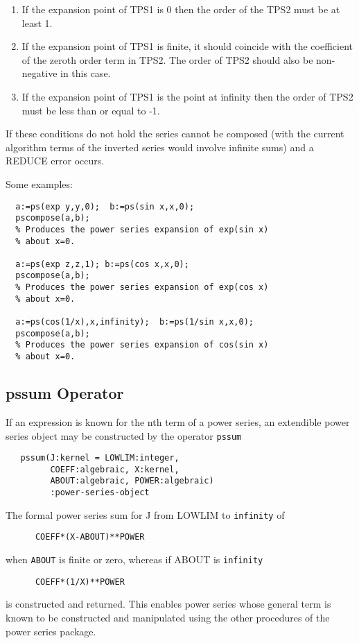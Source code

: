 \begin{enumerate}
\item If the expansion point of TPS1 is 0 then the order of the
TPS2 must be at least 1.

\item If the expansion point of TPS1 is finite, it should
coincide with the coefficient of the zeroth order term in TPS2.
The order of TPS2 should also be non-negative in this case.

\item If the expansion point of TPS1 is the point at infinity
then the order of TPS2 must be less than or equal to -1.
\end{enumerate}

If these conditions do not hold the series cannot be composed (with
the current algorithm terms of the inverted series would involve
infinite sums) and a REDUCE error occurs.

Some examples:
\begin{verbatim}
  a:=ps(exp y,y,0);  b:=ps(sin x,x,0);
  pscompose(a,b);
  % Produces the power series expansion of exp(sin x)
  % about x=0.

  a:=ps(exp z,z,1); b:=ps(cos x,x,0);
  pscompose(a,b);
  % Produces the power series expansion of exp(cos x)
  % about x=0.

  a:=ps(cos(1/x),x,infinity);  b:=ps(1/sin x,x,0);
  pscompose(a,b);
  % Produces the power series expansion of cos(sin x)
  % about x=0.
\end{verbatim}

\subsection{pssum Operator}
\hypertarget{operator:PSSUM}{}
If an expression is known for the nth term of a power series, an extendible
power series object may be constructed by the operator \texttt{pssum}

\begin{verbatim}
   pssum(J:kernel = LOWLIM:integer, 
         COEFF:algebraic, X:kernel, 
         ABOUT:algebraic, POWER:algebraic)
         :power-series-object
\end{verbatim}

The formal power series sum for J from LOWLIM to \texttt{infinity} of
\begin{verbatim}
      COEFF*(X-ABOUT)**POWER
\end{verbatim}
when \texttt{ABOUT} is finite or zero, whereas if ABOUT is \texttt{infinity}
\begin{verbatim}
      COEFF*(1/X)**POWER
\end{verbatim}
is constructed and returned. This enables power series whose general
term is known to be constructed and manipulated using the other
procedures of the power series package.

